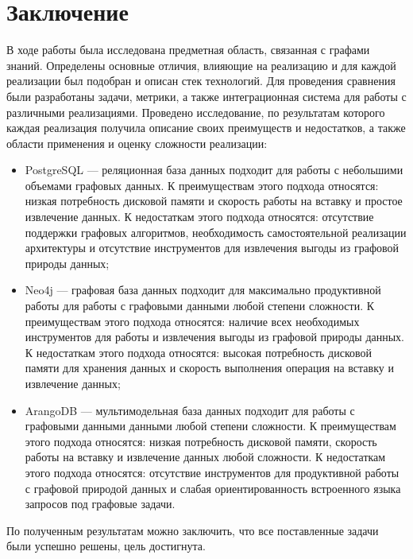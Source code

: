 \chapter*{Заключение}

В ходе работы была исследована предметная область, связанная с графами знаний. Определены основные отличия, влияющие на реализацию и для
каждой реализации был подобран и описан стек технологий. Для проведения сравнения были разработаны задачи, метрики, а также интеграционная
система для работы с различными реализациями. Проведено исследование, по результатам которого каждая реализация получила описание своих
преимуществ и недостатков, а также области применения и оценку сложности реализации:

\begin{itemize}
    \item PostgreSQL — реляционная база данных подходит для работы с небольшими объемами графовых данных. К преимуществам этого подхода относятся: низкая потребность дисковой памяти и скорость работы на вставку и простое извлечение данных. К недостаткам этого подхода относятся: отсутствие поддержки графовых алгоритмов, необходимость самостоятельной реализации архитектуры и отсутствие инструментов для извлечения выгоды из графовой природы данных;
    \item Neo4j — графовая база данных подходит для максимально продуктивной работы для работы с графовыми данными любой степени сложности. К преимуществам этого подхода относятся: наличие всех необходимых инструментов для работы и извлечения выгоды из графовой природы данных. К недостаткам этого подхода относятся: высокая потребность дисковой памяти для хранения данных и скорость выполнения операция на вставку и извлечение данных;
    \item ArangoDB — мультимодельная база данных подходит для работы с графовыми данными данными любой степени сложности. К преимуществам этого подхода относятся: низкая потребность дисковой памяти, скорость работы на вставку и извлечение данных любой сложности. К недостаткам этого подхода относятся: отсутствие инструментов для продуктивной работы с графовой природой данных и слабая ориентированность встроенного языка запросов под графовые задачи.
\end{itemize}

По полученным результатам можно заключить, что все поставленные задачи были успешно решены, цель достигнута.